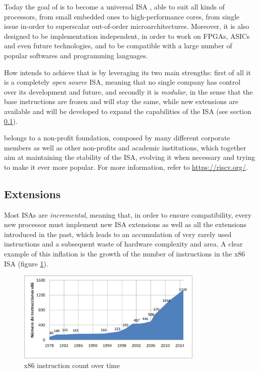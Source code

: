 Today the goal of \riscv is to become a universal \ac{ISA} \cite{reader}, able to suit all kinds of processors, from small embedded ones to high-performance cores, from single issue in-order to superscalar out-of-order microarchitectures. Moreover, it is also designed to be implementation independent, in order to work on \acsp{FPGA}, \acsp{ASIC} and even future technologies, and to be compatible with a large number of popular softwares and programming languages.

How \riscv intends to achieve that is by leveraging its two main strengths: first of all it is a completely \emph{open source} \ac{ISA}, meaning that no single company has control over its development and future, and secondly it is \emph{modular}, in the sense that the base instructions are frozen and will stay the same, while new extensions are available and will be developed to expand the capabilities of the ISA (see section \ref{sec:extensions}).

\riscv belongs to a non-profit foundation, composed by many different corporate members as well as other non-profits and academic institutions, which together aim at maintaining the stability of the \ac{ISA}, evolving it when necessary and trying to make it ever more popular. For more information, refer to \url{https://riscv.org/}.

\subsection{Extensions}\label{sec:extensions}
Most \acp{ISA} are \emph{incremental}, meaning that, in order to ensure compatibility, every new processor must implement new \ac{ISA} extensions as well as all the extensions introduced in the past, which leads to an accumulation of very rarely used instructions and a subsequent waste of hardware complexity and area. A clear example of this inflation is the growth of the number of instructions in the x86 \ac{ISA} (figure \ref{fig:x86}).

\begin{figure}[hbtp]
  \centering
  \includegraphics[width=0.8\textwidth]{img/x86.png}
  \caption{x86 instruction count over time \cite[p.~3]{reader}}
  \label{fig:x86}
\end{figure}

